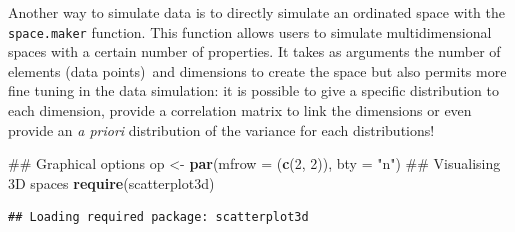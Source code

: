 \documentclass[]{book}
\newenvironment{Shaded}{\begin{snugshade}}{\end{snugshade}}
\newcommand{\KeywordTok}[1]{\textcolor[rgb]{0.13,0.29,0.53}{\textbf{#1}}}
\newcommand{\DataTypeTok}[1]{\textcolor[rgb]{0.13,0.29,0.53}{#1}}
\newcommand{\DecValTok}[1]{\textcolor[rgb]{0.00,0.00,0.81}{#1}}
\newcommand{\StringTok}[1]{\textcolor[rgb]{0.31,0.60,0.02}{#1}}
\newcommand{\NormalTok}[1]{#1}
\theoremstyle{definition}
\theoremstyle{definition}
\theoremstyle{remark}
\begin{document}
Another way to simulate data is to directly simulate an ordinated space
with the \texttt{space.maker} function. This function allows users to
simulate multidimensional spaces with a certain number of properties. It
takes as arguments the number of elements (data points)~and dimensions
to create the space but also permits more fine tuning in the data
simulation: it is possible to give a specific distribution to each
dimension, provide a correlation matrix to link the dimensions or even
provide an \emph{a priori} distribution of the variance for each
distributions!

\begin{Shaded}
\begin{Highlighting}[]
\NormalTok{## Graphical options}
\NormalTok{op <-}\StringTok{ }\KeywordTok{par}\NormalTok{(}\DataTypeTok{mfrow =}\NormalTok{ (}\KeywordTok{c}\NormalTok{(}\DecValTok{2}\NormalTok{, }\DecValTok{2}\NormalTok{)), }\DataTypeTok{bty =} \StringTok{"n"}\NormalTok{)}
\NormalTok{## Visualising 3D spaces}
\KeywordTok{require}\NormalTok{(scatterplot3d)}
\end{Highlighting}
\end{Shaded}

\begin{verbatim}
## Loading required package: scatterplot3d
\end{verbatim}
\end{document}
